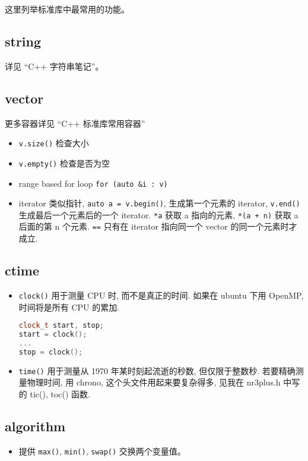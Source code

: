 
\begin{issues}
\issueDraft
\end{issues}

这里列举标准库中最常用的功能。

\subsection{string}
详见 “C++ 字符串笔记”。

\subsection{vector}
更多容器详见 “C++ 标准库常用容器”
\begin{itemize}
\item \verb`v.size()` 检查大小
\item \verb`v.empty()` 检查是否为空
\item range based for loop \verb`for (auto &i : v)`
\item iterator 类似指针, \verb`auto a = v.begin()`, 生成第一个元素的 iterator, \verb`v.end()` 生成最后一个元素后的一个 iterator. \verb`*a` 获取 a 指向的元素, \verb`*(a + n)` 获取 a 后面的第 n 个元素. \verb`==` 只有在 iterator 指向同一个 vector 的同一个元素时才成立.
\end{itemize}

\subsection{ctime}
\begin{itemize}
\item \verb`clock()` 用于测量 CPU 时, 而不是真正的时间. 如果在 ubuntu 下用 OpenMP, 时间将是所有 CPU 的累加.
\begin{lstlisting}[language=cpp]
clock_t start, stop;
start = clock();
...
stop = clock();
\end{lstlisting}
\item \verb`time()` 用于测量从 1970 年某时刻起流逝的秒数, 但仅限于整数秒.
若要精确测量物理时间, 用 chrono, 这个头文件用起来要复杂得多, 见我在 nr3plus.h 中写的 tic(), toc() 函数.
\end{itemize}

\subsection{algorithm}
\begin{itemize}
\item 提供 \verb`max()`, \verb`min()`, \verb`swap()` 交换两个变量值。
\end{itemize}


